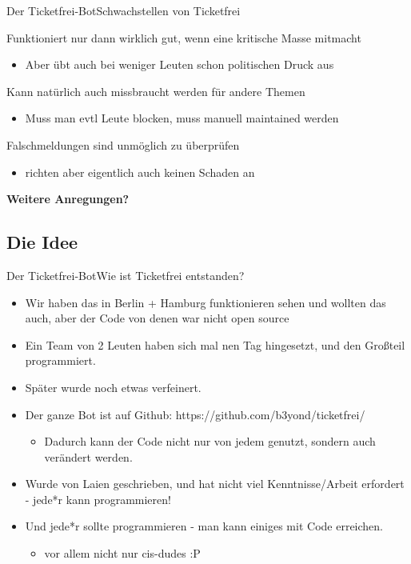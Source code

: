 \documentclass[10pt]{beamer}
\begin{document}
{\begin{frame}{Der Ticketfrei-Bot}{Schwachstellen von Ticketfrei}
\begin{block}{Funktioniert nur dann wirklich gut, wenn eine kritische Masse mitmacht}
  \begin{itemize}
    \item Aber übt auch bei weniger Leuten schon politischen Druck aus
  \end{itemize}
\end{block}

\begin{block}{Kann natürlich auch missbraucht werden für andere Themen}
  \begin{itemize}
    \item Muss man evtl Leute blocken, muss manuell maintained werden
  \end{itemize}
\end{block}

\begin{block}{Falschmeldungen sind unmöglich zu überprüfen}
  \begin{itemize}
    \item richten aber eigentlich auch keinen Schaden an
  \end{itemize}
\end{block}

\textbf{Weitere Anregungen?}

\end{frame}

\subsection{Die Idee}
\begin{frame}{Der Ticketfrei-Bot}{Wie ist Ticketfrei entstanden?}

\begin{itemize}
    \item<1-> Wir haben das in Berlin + Hamburg funktionieren sehen und wollten das auch, aber der Code von denen war nicht open source
    \item<1-> Ein Team von 2 Leuten haben sich mal nen Tag hingesetzt, und den Großteil programmiert.
    \item<1-> Später wurde noch etwas verfeinert.
    \item<2-> Der ganze Bot ist auf Github: https://github.com/b3yond/ticketfrei/
  \begin{itemize}
    \item Dadurch kann der Code nicht nur von jedem genutzt, sondern auch verändert werden.
  \end{itemize}
    \item<2-> Wurde von Laien geschrieben, und hat nicht viel Kenntnisse/Arbeit erfordert - jede*r kann programmieren!
	\item<2-> Und jede*r sollte programmieren - man kann einiges mit Code erreichen.
  \begin{itemize}
    \item vor allem nicht nur cis-dudes :P
  \end{itemize}
\end{itemize}
    


\end{frame}}
\end{document}
